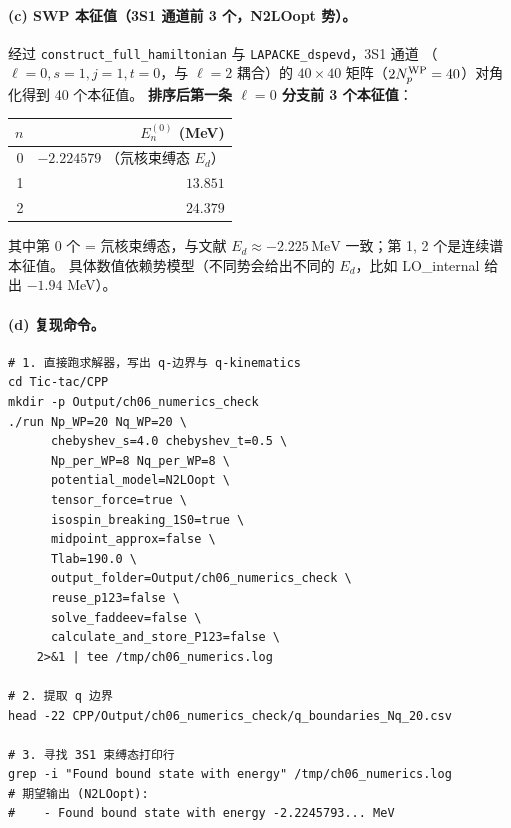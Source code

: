 \begin{numericalbox}[label={box:ch06-numerical-closure}]
\paragraph{(c) SWP 本征值（3S1 通道前 3 个，N2LOopt 势）。}
经过 \texttt{construct\_full\_hamiltonian} 与
\texttt{LAPACKE\_dspevd}，3S1 通道
（\(\ell = 0, s = 1, j = 1, t = 0\)，与 \(\ell = 2\) 耦合）的
\(40 \times 40\) 矩阵（\(2{N_{p}^{\text{WP}}} = 40\)）对角化得到 40 个本征值。
\textbf{排序后第一条 \(\ell = 0\) 分支前 3 个本征值}：
\begin{center}
\begin{tabular}{rr}
\toprule
\(n\) & \(E_n^{(0)}\) (MeV) \\
\midrule
 0 &  \(-2.224579\) （氘核束缚态 \(E_d\)） \\
 1 &  \(\phantom{-}13.851\) \\
 2 &  \(\phantom{-}24.379\) \\
\bottomrule
\end{tabular}
\end{center}
其中第 0 个 = 氘核束缚态，与文献 \(E_d \approx -2.225\,\mathrm{MeV}\)
一致；第 1, 2 个是连续谱本征值。
具体数值依赖势模型（不同势会给出不同的 \(E_d\)，比如 LO\_internal 给出
\(-1.94\) MeV）。

\paragraph{(d) 复现命令。}
\begin{lstlisting}[style=config]
# 1. 直接跑求解器，写出 q-边界与 q-kinematics
cd Tic-tac/CPP
mkdir -p Output/ch06_numerics_check
./run Np_WP=20 Nq_WP=20 \
      chebyshev_s=4.0 chebyshev_t=0.5 \
      Np_per_WP=8 Nq_per_WP=8 \
      potential_model=N2LOopt \
      tensor_force=true \
      isospin_breaking_1S0=true \
      midpoint_approx=false \
      Tlab=190.0 \
      output_folder=Output/ch06_numerics_check \
      reuse_p123=false \
      solve_faddeev=false \
      calculate_and_store_P123=false \
    2>&1 | tee /tmp/ch06_numerics.log

# 2. 提取 q 边界
head -22 CPP/Output/ch06_numerics_check/q_boundaries_Nq_20.csv

# 3. 寻找 3S1 束缚态打印行
grep -i "Found bound state with energy" /tmp/ch06_numerics.log
# 期望输出 (N2LOopt):
#    - Found bound state with energy -2.2245793... MeV
\end{lstlisting}


\end{numericalbox}
